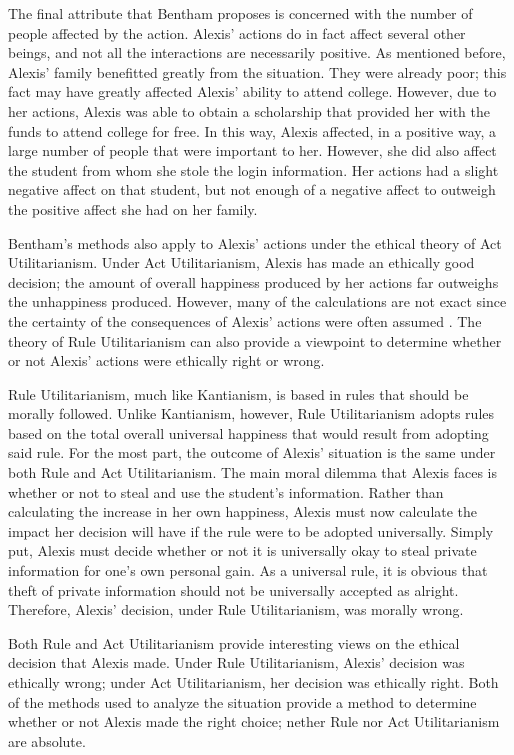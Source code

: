 \documentclass{paper}
\begin{document}
\begin{linenumbers}
The final attribute that Bentham proposes is concerned with the number of people affected by the action. Alexis' actions do in fact affect several other beings, and not all the interactions are necessarily positive. As mentioned before, Alexis' family benefitted greatly from the situation. They were already poor; this fact may have greatly affected Alexis' ability to attend college. However, due to her actions, Alexis was able to obtain a scholarship that provided her with the funds to attend college for free. In this way, Alexis affected, in a positive way, a large number of people that were important to her. However, she did also affect the student from whom she stole the login information. Her actions had a slight negative affect on that student, but not enough of a negative affect to outweigh the positive affect she had on her family.

Bentham's methods also apply to Alexis' actions under the ethical theory of Act Utilitarianism. Under Act Utilitarianism, Alexis has made an ethically good decision; the amount of overall happiness produced by her actions far outweighs the unhappiness produced. However, many of the calculations are not exact since the certainty of the consequences of Alexis' actions were often assumed \cite[77]{ethics}. The theory of Rule Utilitarianism can also provide a viewpoint to determine whether or not Alexis' actions were ethically right or wrong.

Rule Utilitarianism, much like Kantianism, is based in rules that should be morally followed. Unlike Kantianism, however, Rule Utilitarianism adopts rules based on the total overall universal happiness that would result from adopting said rule. For the most part, the outcome of Alexis' situation is the same under both Rule and Act Utilitarianism. The main moral dilemma that Alexis faces is whether or not to steal and use the student's information. Rather than calculating the increase in her own happiness, Alexis must now calculate the impact her decision will have if the rule were to be adopted universally. Simply put, Alexis must decide whether or not it is universally okay to steal private information for one's own personal gain. As a universal rule, it is obvious that theft of private information should not be universally accepted as alright. Therefore, Alexis' decision, under Rule Utilitarianism, was morally wrong.

Both Rule and Act Utilitarianism provide interesting views on the ethical decision that Alexis made. Under Rule Utilitarianism, Alexis' decision was ethically wrong; under Act Utilitarianism, her decision was ethically right. Both of the methods used to analyze the situation provide a method to determine whether or not Alexis made the right choice; nether Rule nor Act Utilitarianism are absolute.
\end{linenumbers}
\newpage
\printbibliography
\end{document}

